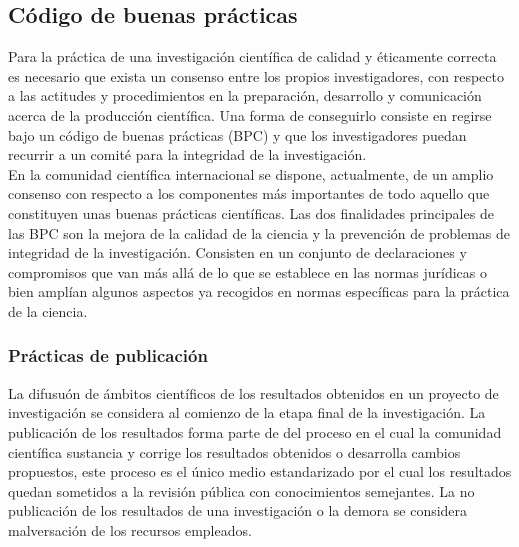 \subsection*{Código de buenas prácticas}
Para la práctica de una investigación científica de calidad y éticamente correcta es necesario que exista un consenso entre los propios 
investigadores, con respecto a las actitudes y procedimientos en la preparación, desarrollo y comunicación acerca de la producción 
científica. Una forma de conseguirlo consiste en regirse bajo un código de buenas prácticas (BPC) y que los investigadores puedan
recurrir a un comité para la integridad de la investigación.\\
En la comunidad científica internacional se dispone, actualmente, de un amplio consenso
con respecto a los componentes más importantes de todo aquello que constituyen unas
buenas prácticas científicas. Las dos finalidades principales de las BPC son la mejora
de la calidad de la ciencia y la prevención de problemas de integridad de la investigación.
Consisten en un conjunto de declaraciones y compromisos que van más allá de lo que se
establece en las normas jurídicas o bien amplían algunos aspectos ya recogidos en normas
específicas para la práctica de la ciencia.
\subsubsection*{Prácticas de publicación}
La difusuón de ámbitos científicos de los resultados obtenidos en un proyecto de investigación se considera al comienzo de la etapa
final de la investigación. La publicación de los resultados forma parte de del proceso en el cual la comunidad científica 
sustancia y corrige los resultados obtenidos o desarrolla cambios propuestos, este proceso es el único medio estandarizado por el cual
los resultados quedan sometidos a la revisión pública con conocimientos semejantes. La no publicación de los resultados de una investigación
o la demora se considera malversación de los recursos empleados.